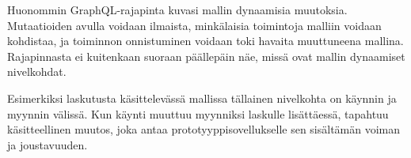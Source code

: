 Huonommin GraphQL-rajapinta kuvasi mallin dynaamisia muutoksia.
Mutaatioiden avulla voidaan ilmaista, minkälaisia toimintoja malliin
voidaan kohdistaa, ja toiminnon onnistuminen voidaan toki havaita
muuttuneena mallina. Rajapinnasta ei kuitenkaan suoraan päällepäin näe,
missä ovat mallin dynaamiset nivelkohdat.

Esimerkiksi laskutusta käsittelevässä mallissa tällainen nivelkohta on
käynnin ja myynnin välissä. Kun käynti muuttuu myynniksi laskulle
lisättäessä, tapahtuu käsitteellinen muutos, joka antaa
prototyyppisovellukselle sen sisältämän voiman ja joustavuuden.
